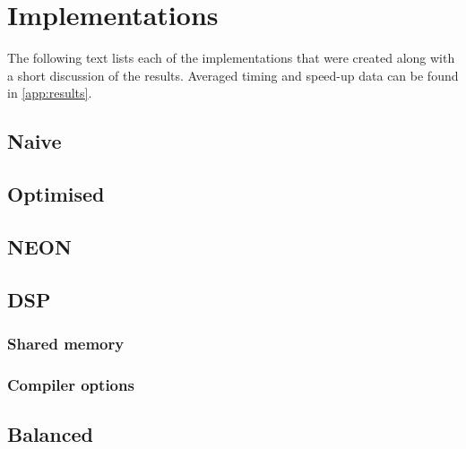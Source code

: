\documentclass[final]{article}
\begin{document}
\section{Implementations}
\label{sec:implementations}

The following text lists each of the implementations that were created along with a short discussion of the results. Averaged timing and speed-up data can be found in \cref{app:results}.

\subsection{Naive}


\subsection{Optimised}


\subsection{NEON}


\subsection{DSP}

\subsubsection{Shared memory}

\subsubsection{Compiler options}


\subsection{Balanced}
\end{document}
